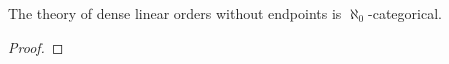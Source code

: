 
\begin{theorem}
    \label{thm:dlo-aleph0-categorical}
    \leanok
    The theory of dense linear orders without endpoints is $\aleph_0$-categorical.
\end{theorem}
\begin{proof}
    \leanok
\end{proof}

